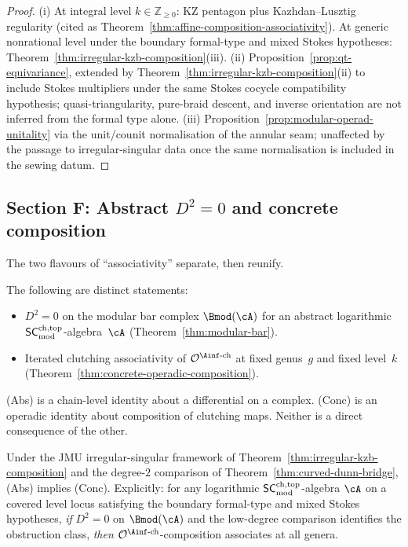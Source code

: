 \begin{proof}
(i) At integral level $k \in \mathbb{Z}_{\ge 0}$: KZ pentagon
plus Kazhdan--Lusztig regularity (cited as
Theorem~\ref{thm:affine-composition-associativity}). At generic
nonrational level under the boundary formal-type and mixed Stokes
hypotheses:
Theorem~\ref{thm:irregular-kzb-composition}(iii).
(ii) Proposition~\ref{prop:qt-equivariance}, extended by
Theorem~\ref{thm:irregular-kzb-composition}(ii) to include Stokes
multipliers under the same Stokes cocycle compatibility hypothesis;
quasi-triangularity, pure-braid descent, and inverse orientation are
not inferred from the formal type alone.
(iii) Proposition~\ref{prop:modular-operad-unitality} via the
unit/counit normalisation of the annular seam; unaffected by the
passage to irregular-singular data once the same normalisation is
included in the sewing datum.
\end{proof}

\subsection{Section F: Abstract $D^2 = 0$ and concrete composition}
\label{subsec:abstract-concrete-unification}

The two flavours of ``associativity'' separate, then reunify.

\begin{theorem}
\label{thm:abstract-vs-concrete}
The following are distinct statements:
\begin{itemize}
\item[\textbf{(Abs)}] $D^2 = 0$ on the modular bar complex
 $\Bmod(\cA)$ for an abstract logarithmic $\mathsf{SC}^{\mathrm{ch,top}}_{\mathrm{mod}}$-algebra~$\cA$
 (Theorem~\ref{thm:modular-bar}).
\item[\textbf{(Conc)}] Iterated clutching associativity of
 $\mathcal{O}^{\Ainf\text{-ch}}$ at fixed genus~$g$ and fixed
 level~$k$ (Theorem~\ref{thm:concrete-operadic-composition}).
\end{itemize}
(Abs) is a chain-level identity about a differential on a complex.
(Conc) is an operadic identity about composition of clutching
maps. Neither is a direct consequence of the other.
\end{theorem}

\begin{theorem}
\label{thm:abstract-implies-concrete}
Under the JMU irregular-singular framework of
Theorem~\ref{thm:irregular-kzb-composition} and the degree-\(2\)
comparison of Theorem~\ref{thm:curved-dunn-bridge}, (Abs) implies
(Conc).
Explicitly: for any logarithmic $\mathsf{SC}^{\mathrm{ch,top}}_{\mathrm{mod}}$-algebra $\cA$ on a covered
level locus satisfying the boundary formal-type and mixed Stokes
hypotheses, \emph{if} \(D^2 = 0\) on \(\Bmod(\cA)\) and the
low-degree comparison identifies the obstruction class, \emph{then}
$\mathcal{O}^{\Ainf\text{-ch}}$-composition associates at all genera.
\end{theorem}

